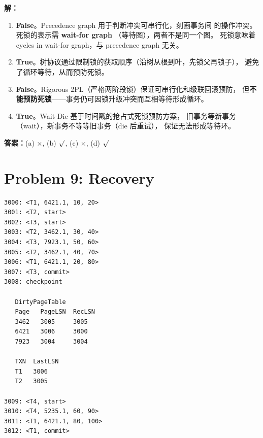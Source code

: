\documentclass[11pt,a4paper]{article}
\newcommand{\solution}{\par\noindent\textcolor{ansblue}{\textbf{解：}}}
\newcommand{\answer}{\par\noindent\textcolor{ansred}{\textbf{答案：}}}
\begin{document}
\begin{enumerate}[leftmargin=*,itemsep=6pt]
  \solution
  \begin{enumerate}[label=(\alph*)]
    \item \textbf{False}。Precedence graph 用于判断冲突可串行化，刻画事务间
          的操作冲突。死锁的表示需 \textbf{wait-for graph}
          （等待图），两者不是同一个图。
          死锁意味着 cycles in wait-for graph，与 precedence graph 无关。
    \item \textbf{True}。树协议通过限制锁的获取顺序（沿树从根到叶，先锁父再锁子），
          避免了循环等待，从而预防死锁。
    \item \textbf{False}。Rigorous 2PL（严格两阶段锁）保证可串行化和级联回滚预防，
          但\textbf{不能预防死锁}——事务仍可因锁升级冲突而互相等待形成循环。
    \item \textbf{True}。Wait-Die 基于时间戳的抢占式死锁预防方案，
          旧事务等新事务（wait），新事务不等等旧事务（die 后重试），
          保证无法形成等待环。
  \end{enumerate}

  \answer (a) \textcolor{ansred}{$\times$}, (b) \textcolor{ansred}{$\surd$},
  (c) \textcolor{ansred}{$\times$}, (d) \textcolor{ansred}{$\surd$}

\end{enumerate}

\newpage
\section*{Problem 9: Recovery}

{\small
\begin{verbatim}
3000: <T1, 6421.1, 10, 20>
3001: <T2, start>
3002: <T3, start>
3003: <T2, 3462.1, 30, 40>
3004: <T3, 7923.1, 50, 60>
3005: <T2, 3462.1, 40, 70>
3006: <T1, 6421.1, 20, 80>
3007: <T3, commit>
3008: checkpoint

   DirtyPageTable
   Page   PageLSN  RecLSN
   3462   3005     3005
   6421   3006     3000
   7923   3004     3004

   TXN  LastLSN
   T1   3006
   T2   3005

3009: <T4, start>
3010: <T4, 5235.1, 60, 90>
3011: <T1, 6421.1, 80, 100>
3012: <T1, commit>
\end{verbatim}}
\end{document}
